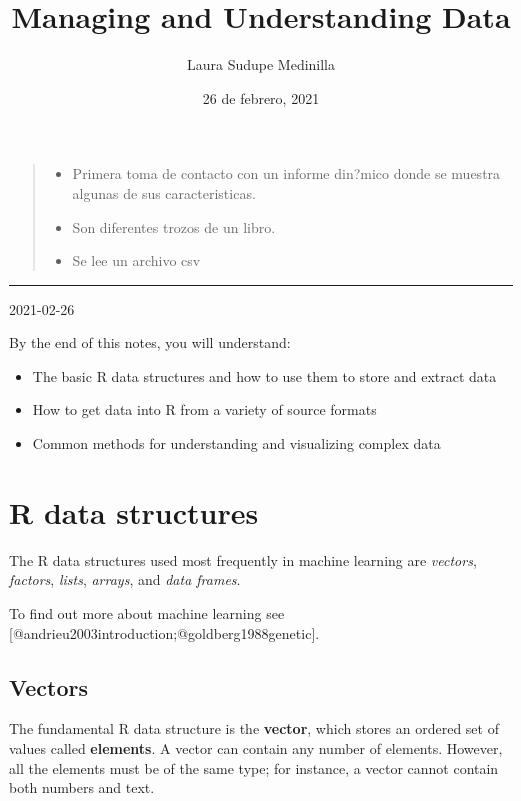 \documentclass[
]{article}
\title{Managing and Understanding Data}
\author{Laura Sudupe Medinilla}
\date{26 de febrero, 2021}
\providecommand{\tightlist}{%
  \setlength{\itemsep}{0pt}\setlength{\parskip}{0pt}}
\begin{document}
\maketitle

{
\setcounter{tocdepth}{2}
\tableofcontents
}
\begin{quote}
\begin{itemize}
\tightlist
\item
  Primera toma de contacto con un informe din?mico donde se muestra
  algunas de sus caracteristicas.
\item
  Son diferentes trozos de un libro.
\item
  Se lee un archivo csv
\end{itemize}
\end{quote}

\begin{center}\rule{0.5\linewidth}{0.5pt}\end{center}

2021-02-26

By the end of this notes, you will understand:

\begin{itemize}
\tightlist
\item
  The basic R data structures and how to use them to store and extract
  data
\item
  How to get data into R from a variety of source formats
\item
  Common methods for understanding and visualizing complex data
\end{itemize}

\hypertarget{r-data-structures}{%
\section{R data structures}\label{r-data-structures}}

The R data structures used most frequently in machine learning are
\emph{vectors}, \emph{factors}, \emph{lists}, \emph{arrays}, and
\emph{data frames}.

To find out more about machine learning see
{[}@andrieu2003introduction;@goldberg1988genetic{]}.

\hypertarget{vectors}{%
\subsection{Vectors}\label{vectors}}

The fundamental R data structure is the \textbf{vector}, which stores an
ordered set of values called \textbf{elements}. A vector can contain any
number of elements. However, all the elements must be of the same type;
for instance, a vector cannot contain both numbers and text.
\end{document}
